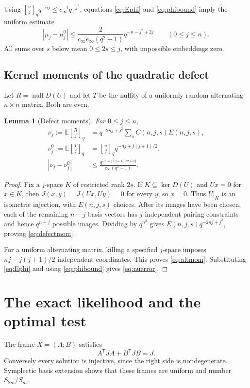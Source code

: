 \documentclass[11pt]{article}
\newtheorem{lemma}[theorem]{Lemma}
\theoremstyle{definition}\newtheorem{definition}[theorem]{Definition}
\theoremstyle{remark}\newtheorem{remark}[theorem]{Remark}
\newcommand{\E}{\mathbb E}
\newcommand{\nul}{\operatorname{null}}
\newcommand{\gb}[2]{\genfrac{[}{]}{0pt}{}{#1}{#2}_{q}}
\newcommand{\1}{\mathbf 1}
\begin{document}
Using $\gb nj q^{-nj}\le c_\infty^{-1}q^{-j^2}$, equations
\eqref{eq:Ephi} and \eqref{eq:phibound} imply the uniform estimate
\begin{equation}\label{eq:muerror}
 |\mu_j-\mu_j^0|
 \le \frac{2}{c_\infty e_\infty(q^2-1)}
       q^{-n-j^2+2j}\qquad(0\le j\le n).
\end{equation}
All sums over $s$ below mean $0\le2s\le j$, with impossible embeddings zero.

\subsection{Kernel moments of the quadratic defect}
Let $R=\nul D(U)$ and let $T$ be the nullity of a uniformly random
alternating $n\times n$ matrix. Both are even.

\begin{lemma}[Defect moments]\label{lem:defectmom}
For $0\le j\le n$,
\begin{align}
 \nu_j:=\E\gb Rj
 &=q^{-2nj+j^2}\sum_s C(n,j,s)E(n,j,s),\label{eq:defectmom}\\
 \nu_j^0:=\E\gb Tj
 &=\gb nj q^{-nj+j(j+1)/2},\label{eq:altmom}\\
 |\nu_j-\nu_j^0|
 &\le\frac{q^{-n-j(j-1)/2+2j}}{c_\infty(q^2-1)}.\label{eq:nuerror}
\end{align}
\end{lemma}

\begin{proof}
Fix a $j$-space $K$ of restricted rank $2s$. If $K\subseteq\ker D(U)$
and $Ux=0$ for $x\in K$, then $J(x,y)=J(Ux,Uy)=0$ for every $y$, so
$x=0$. Thus $U|_K$ is an isometric injection, with $E(n,j,s)$ choices.
After its images have been chosen, each of the remaining $n-j$ basis
vectors has $j$ independent pairing constraints and hence $q^{n-j}$
possible images. Dividing by $q^{n^2}$ gives
$E(n,j,s)q^{-2nj+j^2}$, proving \eqref{eq:defectmom}.

For a uniform alternating matrix, killing a specified $j$-space imposes
$nj-j(j+1)/2$ independent coordinates. This proves \eqref{eq:altmom}.
Substituting \eqref{eq:Ephi} and using \eqref{eq:phibound} gives
\eqref{eq:nuerror}.
\end{proof}

\section{The exact likelihood and the optimal test}\label{sec:likelihood}

The frame $X=(A;B)$ satisfies
\begin{equation}\label{eq:gram}
 A^{\mathsf T}JA+B^{\mathsf T}JB=J.
\end{equation}
Conversely every solution is injective, since the right side is
nondegenerate. Symplectic basis extension shows that these frames are
uniform and number $S_{2m}/S_m$.
\end{document}

